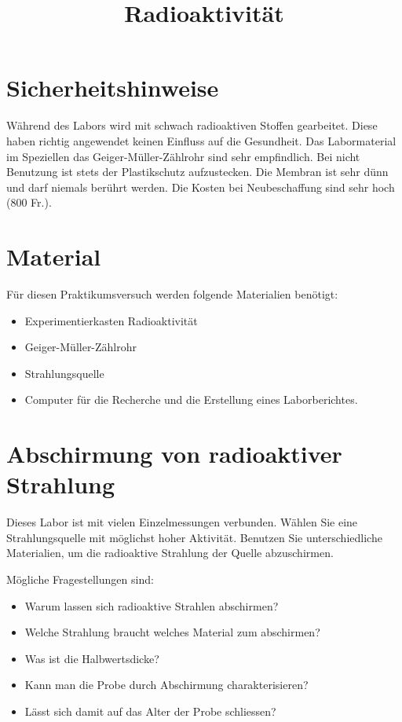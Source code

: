 \documentclass[12pt,a4paper, twosite]{article}
\author{}
\date{}
\title{Radioaktivität}
\begin{document}
\maketitle

\section*{Sicherheitshinweise}
Während des Labors wird mit schwach radioaktiven Stoffen gearbeitet. Diese haben richtig angewendet keinen Einfluss auf
die Gesundheit. Das Labormaterial im Speziellen das Geiger-Müller-Zählrohr sind sehr empfindlich.
Bei nicht Benutzung ist stets der Plastikschutz aufzustecken. Die Membran ist sehr dünn und darf niemals berührt werden.
Die Kosten bei Neubeschaffung sind sehr hoch (800 Fr.).

\section*{Material}
Für diesen Praktikumsversuch werden folgende Materialien benötigt:
\begin{itemize}
	\item Experimentierkasten Radioaktivität 
	\item Geiger-Müller-Zählrohr
	\item Strahlungsquelle
	\item Computer für die Recherche und die Erstellung eines Laborberichtes.
\end{itemize}



\section*{Abschirmung von radioaktiver Strahlung}
Dieses Labor ist mit vielen Einzelmessungen verbunden.
Wählen Sie eine Strahlungsquelle mit möglichst hoher Aktivität.
Benutzen Sie unterschiedliche Materialien, um die radioaktive Strahlung der Quelle abzuschirmen. 

Mögliche Fragestellungen sind:
\begin{itemize}
	\item Warum lassen sich radioaktive Strahlen abschirmen?
	\item Welche Strahlung braucht welches Material zum abschirmen?
	\item Was ist die Halbwertsdicke?
	\item Kann man die Probe durch Abschirmung charakterisieren?
	\item Lässt sich damit auf das Alter der Probe schliessen?
\end{itemize}
\end{document}
